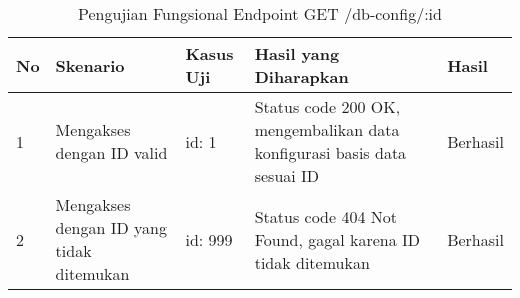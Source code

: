 \begin{table}[H]
    \centering
    \begin{tabular}{|p{0.5cm}|p{3cm}|p{5cm}|p{5cm}|p{1.5cm}|}
        \hline
        \rowcolor[HTML]{DAE8FC} 
        \textbf{No} & \textbf{Skenario} & \textbf{Kasus Uji} & \textbf{Hasil yang Diharapkan} & \textbf{Hasil} \\ \hline
        1 & Mengakses dengan ID valid & 
        id: 1 & 
        Status code 200 OK, mengembalikan data konfigurasi basis data sesuai ID & 
        Berhasil \\ \hline
        2 & Mengakses dengan ID yang tidak ditemukan & 
        id: 999 & 
        Status code 404 Not Found, gagal karena ID tidak ditemukan & 
        Berhasil \\ \hline
    \end{tabular}
    \caption{Pengujian Fungsional Endpoint GET /db-config/:id}
    \label{tab:db_config_getone_testing}
\end{table}
